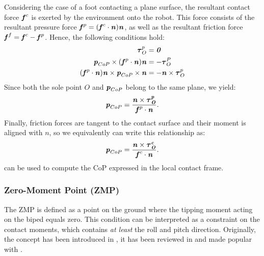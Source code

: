 Considering the case of a foot contacting a plane surface, the resultant contact force $\bm{\mathit{f}}^c$ is exerted by the environment onto the robot. This force consists of the resultant pressure force $\bm{\mathit{f}}^p=(\bm{\mathit{f}}^c\cdot\bm{\mathit{n}})\bm{\mathit{n}}$, as well as the resultant friction force $\bm{\mathit{f}}^f=\bm{\mathit{f}}^c-\bm{\mathit{f}}^p$.
Hence, the following conditions hold:
\begin{align*}
\bm{\mathit{\tau}}_O^p 		&= \bm{\mathit{0}} \\
\bm{\mathit{p}}_{CoP}\times(\bm{\mathit{f}}^p\cdot\bm{\mathit{n}})\bm{\mathit{n}}	&= -\bm{\mathit{\tau}}_O^P \\
(\bm{\mathit{f}}^p\cdot\bm{\mathit{n}})\bm{\mathit{n}}\times\bm{\mathit{p}}_{CoP}\times\bm{\mathit{n}}	&= -\bm{\mathit{n}}\times\bm{\mathit{\tau}}_O^p
\end{align*}
Since both the sole point $O$ and $\bm{\mathit{p}}_{CoP}$ belong to the same plane, we yield:
\begin{equation*}
\bm{\mathit{p}}_{CoP}=\dfrac{\bm{\mathit{n}}\times\bm{\mathit{\bm{\mathit{\tau}}_O^p}}}{\bm{\mathit{f}}^p\cdot\bm{\mathit{n}}}.
\end{equation*}
Finally, friction forces are tangent to the contact surface and their moment is aligned with $n$, so we equivalently can write this relationship as:
\begin{equation}\label{eqn:CoPComputation}
\bm{\mathit{p}}_{CoP}=\dfrac{\bm{\mathit{n}}\times\bm{\mathit{\bm{\mathit{\tau}}_O^c}}}{\bm{\mathit{f}}^c\cdot\bm{\mathit{n}}}.
\end{equation}
 can be used to compute the \gls{CoP} expressed in the local contact frame.

%
\subsubsection{Zero-Moment Point (ZMP)}
The \gls{ZMP} is defined as a point on the ground where the tipping moment acting on the biped equals zero. This condition can be interpreted as a constraint on the contact moments, which contains \textit{at least} the roll and pitch direction. Originally, the concept has been introduced in \cite{vukobratovic1972stability}, it has been reviewed in \cite{vukobratovic2004zero} and made popular with \cite{kajita2003biped}.

